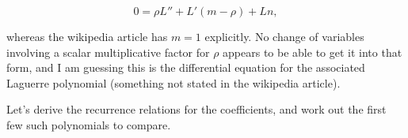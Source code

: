 \begin{equation}\label{eqn:hyrdogenLaguerre:100}
0 = 
\rho L''
+L' \left( m -\rho \right) 
+L n,
\end{equation}

whereas the wikipedia article has $m=1$ explicitly.  No change of variables involving a scalar multiplicative factor for $\rho$ appears to be able to get it into that form, and I am guessing this is the differential equation for the associated Laguerre polynomial (something not stated in the wikipedia article).

Let's derive the recurrence relations for the coefficients, and work out the first few such polynomials to compare.

\EndArticle
